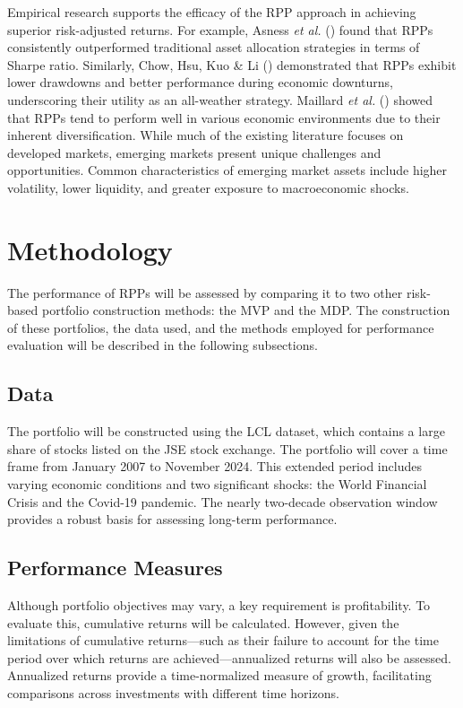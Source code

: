 \documentclass[11pt,preprint]{elsarticle}
\numberwithin{equation}{section}
\numberwithin{figure}{section}
\numberwithin{table}{section}
\begin{document}
Empirical research supports the efficacy of the RPP approach in
achieving superior risk-adjusted returns. For example, Asness \emph{et
al.} () found that RPPs
consistently outperformed traditional asset allocation strategies in
terms of Sharpe ratio. Similarly, Chow, Hsu, Kuo \& Li
() demonstrated that RPPs exhibit
lower drawdowns and better performance during economic downturns,
underscoring their utility as an all-weather strategy. Maillard \emph{et
al.} () showed that RPPs tend
to perform well in various economic environments due to their inherent
diversification. While much of the existing literature focuses on
developed markets, emerging markets present unique challenges and
opportunities. Common characteristics of emerging market assets include
higher volatility, lower liquidity, and greater exposure to
macroeconomic shocks.

\section{Methodology}\label{methodology}

The performance of RPPs will be assessed by comparing it to two other
risk-based portfolio construction methods: the MVP and the MDP. The
construction of these portfolios, the data used, and the methods
employed for performance evaluation will be described in the following
subsections.

\subsection{Data}\label{data}

The portfolio will be constructed using the LCL dataset, which contains
a large share of stocks listed on the JSE stock exchange. The portfolio
will cover a time frame from January 2007 to November 2024. This
extended period includes varying economic conditions and two significant
shocks: the World Financial Crisis and the Covid-19 pandemic. The nearly
two-decade observation window provides a robust basis for assessing
long-term performance.

\subsection{Performance Measures}\label{performance-measures}

Although portfolio objectives may vary, a key requirement is
profitability. To evaluate this, cumulative returns will be calculated.
However, given the limitations of cumulative returns---such as their
failure to account for the time period over which returns are
achieved---annualized returns will also be assessed. Annualized returns
provide a time-normalized measure of growth, facilitating comparisons
across investments with different time horizons.
\end{document}
